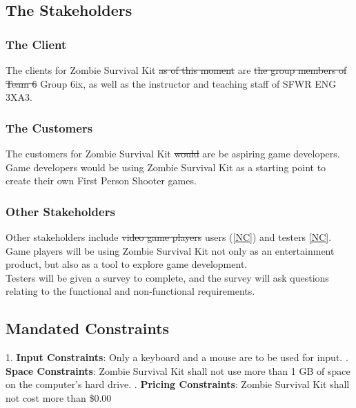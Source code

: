 \documentclass[12pt, titlepage]{article}
\begin{document}
\subsection{The Stakeholders}

\subsubsection{The Client}
The clients for Zombie Survival Kit \sout{as of this moment} are \sout{the group members of Team 6} {\color{magenta} Group 6ix}, as well as the instructor and teaching staff of SFWR ENG 3XA3.

\subsubsection{The Customers}
The customers for Zombie Survival Kit \sout{would} {\color{magenta} are} be aspiring game developers.
\newline
Game developers would be using Zombie Survival Kit as a starting point to create their own First Person Shooter games.

\subsubsection{Other Stakeholders}
Other stakeholders include \sout{video game players} users (\ref{NC}) and {\color{magenta} testers \ref{NC}}. \\
Game players will be using Zombie Survival Kit not only as an entertainment product, but also as a tool to explore game development. \\
{\color{magenta} Testers will be given a survey to complete, and the survey will ask questions relating to the functional and non-functional requirements.}

\subsection{Mandated Constraints}
1. \textbf{Input Constraints}: Only a keyboard and a mouse are to be used for input.
\newline
{}. \textbf{Space Constraints}: Zombie Survival Kit shall not use more than 1 GB of space on the computer’s hard drive.
\newline
{}. \textbf{Pricing Constraints}: Zombie Survival Kit shall not cost more than \$0.00
\end{document}
